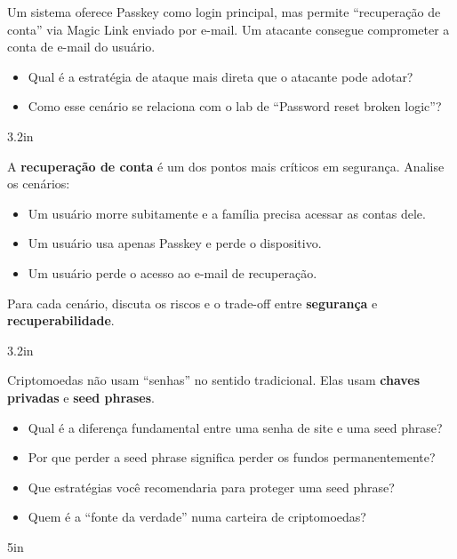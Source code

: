 \documentclass[12pt]{exam}
\begin{document}
\begin{questions}

\question Um sistema oferece Passkey como login principal, mas permite 
``recuperação de conta'' via Magic Link enviado por e-mail. Um atacante 
consegue comprometer a conta de e-mail do usuário.

\begin{itemize}
\item Qual é a estratégia de ataque mais direta que o atacante pode adotar?
\item Como esse cenário se relaciona com o lab de ``Password reset broken logic''?
\end{itemize}
\begin{solutionbox}{3.2in}
\end{solutionbox}

\question A \textbf{recuperação de conta} é um dos pontos mais críticos em 
segurança. Analise os cenários:

\begin{itemize}
\item Um usuário morre subitamente e a família precisa acessar as contas dele.
\item Um usuário usa apenas Passkey e perde o dispositivo.
\item Um usuário perde o acesso ao e-mail de recuperação.
\end{itemize}

Para cada cenário, discuta os riscos e o trade-off entre \textbf{segurança} 
e \textbf{recuperabilidade}.
\begin{solutionbox}{3.2in}
\end{solutionbox}


\question Criptomoedas não usam ``senhas'' no sentido tradicional. Elas usam 
\textbf{chaves privadas} e \textbf{seed phrases}.

\begin{itemize}
\item Qual é a diferença fundamental entre uma senha de site e uma seed phrase?
\item Por que perder a seed phrase significa perder os fundos permanentemente?
\item Que estratégias você recomendaria para proteger uma seed phrase?
\item Quem é a ``fonte da verdade'' numa carteira de criptomoedas?
\end{itemize}
\begin{solutionbox}{5in}
\end{solutionbox}

\end{questions}
\end{document}
